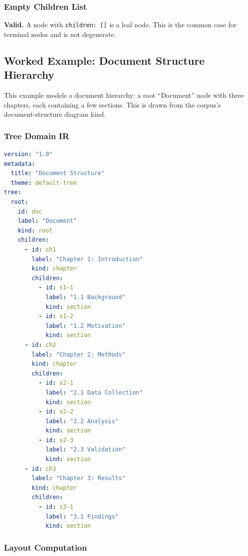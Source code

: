 \subsubsection{Empty Children List}

\textbf{Valid.} A node with \texttt{children: []} is a leaf node. This is the common case for terminal nodes and is not degenerate.

\subsection{Worked Example: Document Structure Hierarchy}
\label{sec:tree-worked-example}

This example models a document hierarchy: a root ``Document'' node with three chapters, each containing a few sections. This is drawn from the corpus's document-structure diagram kind.

\subsubsection{Tree Domain IR}

\begin{lstlisting}[language=yaml,caption={Document hierarchy --- Tree Domain IR}]
version: "1.0"
metadata:
  title: "Document Structure"
  theme: default-tree
tree:
  root:
    id: doc
    label: "Document"
    kind: root
    children:
      - id: ch1
        label: "Chapter 1: Introduction"
        kind: chapter
        children:
          - id: s1-1
            label: "1.1 Background"
            kind: section
          - id: s1-2
            label: "1.2 Motivation"
            kind: section
      - id: ch2
        label: "Chapter 2: Methods"
        kind: chapter
        children:
          - id: s2-1
            label: "2.1 Data Collection"
            kind: section
          - id: s2-2
            label: "2.2 Analysis"
            kind: section
          - id: s2-3
            label: "2.3 Validation"
            kind: section
      - id: ch3
        label: "Chapter 3: Results"
        kind: chapter
        children:
          - id: s3-1
            label: "3.1 Findings"
            kind: section
\end{lstlisting}

\subsubsection{Layout Computation}


